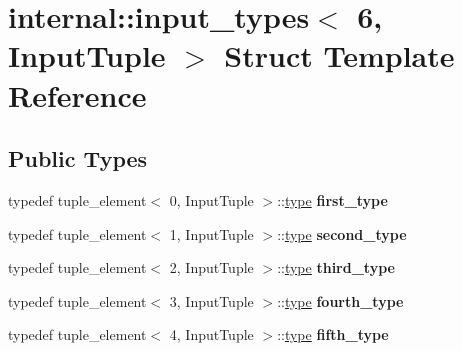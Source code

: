 \hypertarget{structinternal_1_1input__types_3_016_00_01InputTuple_01_4}{}\section{internal\+:\+:input\+\_\+types$<$ 6, Input\+Tuple $>$ Struct Template Reference}
\label{structinternal_1_1input__types_3_016_00_01InputTuple_01_4}
\subsection*{Public Types}
\begin{DoxyCompactItemize}
\item 
\hypertarget{structinternal_1_1input__types_3_016_00_01InputTuple_01_4_a3ea4555d40984cd5f07ce9792319790c}{}typedef tuple\+\_\+element$<$ 0, Input\+Tuple $>$\+::\hyperlink{classinternal_1_1tagged__msg}{type} {\bfseries first\+\_\+type}\label{structinternal_1_1input__types_3_016_00_01InputTuple_01_4_a3ea4555d40984cd5f07ce9792319790c}

\item 
\hypertarget{structinternal_1_1input__types_3_016_00_01InputTuple_01_4_ae882dfd02f57c57735c5784e0cc04d41}{}typedef tuple\+\_\+element$<$ 1, Input\+Tuple $>$\+::\hyperlink{classinternal_1_1tagged__msg}{type} {\bfseries second\+\_\+type}\label{structinternal_1_1input__types_3_016_00_01InputTuple_01_4_ae882dfd02f57c57735c5784e0cc04d41}

\item 
\hypertarget{structinternal_1_1input__types_3_016_00_01InputTuple_01_4_a4e01dc5499a6d2600c448f8a4b4660f4}{}typedef tuple\+\_\+element$<$ 2, Input\+Tuple $>$\+::\hyperlink{classinternal_1_1tagged__msg}{type} {\bfseries third\+\_\+type}\label{structinternal_1_1input__types_3_016_00_01InputTuple_01_4_a4e01dc5499a6d2600c448f8a4b4660f4}

\item 
\hypertarget{structinternal_1_1input__types_3_016_00_01InputTuple_01_4_a2a6d32ea199433c42fc1217648ca521d}{}typedef tuple\+\_\+element$<$ 3, Input\+Tuple $>$\+::\hyperlink{classinternal_1_1tagged__msg}{type} {\bfseries fourth\+\_\+type}\label{structinternal_1_1input__types_3_016_00_01InputTuple_01_4_a2a6d32ea199433c42fc1217648ca521d}

\item 
\hypertarget{structinternal_1_1input__types_3_016_00_01InputTuple_01_4_ad11f7c99240421aadb0d09db04b4aa1a}{}typedef tuple\+\_\+element$<$ 4, Input\+Tuple $>$\+::\hyperlink{classinternal_1_1tagged__msg}{type} {\bfseries fifth\+\_\+type}\label{structinternal_1_1input__types_3_016_00_01InputTuple_01_4_ad11f7c99240421aadb0d09db04b4aa1a}


\end{DoxyCompactItemize}
